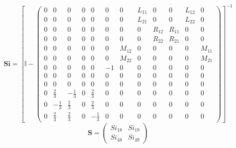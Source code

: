 \[ \mathbf{Si} = \left[ \mathbb{I}  - \left(\begin{smallmatrix} 0 & 0 & 0 & 0 & 0 & 0 & 0 & L_{11} & 0 & 0 & L_{12} & 0 \\ 0 & 0 & 0 & 0 & 0 & 0 & 0 & L_{21} & 0 & 0 & L_{22} & 0 \\ 0 & 0 & 0 & 0 & 0 & 0 & 0 & 0 & R_{12} & R_{11} & 0 & 0 \\ 0 & 0 & 0 & 0 & 0 & 0 & 0 & 0 & R_{22} & R_{21} & 0 & 0 \\ 0 & 0 & 0 & 0 & 0 & 0 & M_{12} & 0 & 0 & 0 & 0 & M_{11} \\ 0 & 0 & 0 & 0 & 0 & 0 & M_{22} & 0 & 0 & 0 & 0 & M_{21} \\ 0 & 0 & 0 & 0 & 0 & -1 & 0 & 0 & 0 & 0 & 0 & 0 \\ 0 & 0 & 0 & 0 & 0 & 0 & 0 & 0 & 0 & 0 & 0 & 0 \\ 0 & 0 & 0 & 0 & 0 & 0 & 0 & 0 & 0 & 0 & 0 & 0 \\ 0 & \frac{2}{3} & -\frac{1}{3} & 0 & \frac{2}{3} & 0 & 0 & 0 & 0 & 0 & 0 & 0 \\ 0 & -\frac{1}{3} & \frac{2}{3} & 0 & \frac{2}{3} & 0 & 0 & 0 & 0 & 0 & 0 & 0 \\ 0 & \frac{2}{3} & \frac{2}{3} & 0 & -\frac{1}{3} & 0 & 0 & 0 & 0 & 0 & 0 & 0 \end{smallmatrix}\right) \right]^{-1} \]
\[ \mathbf{S} = \left(\begin{smallmatrix} Si_{18} & Si_{19} \\ Si_{48} & Si_{49} \end{smallmatrix}\right) \]
